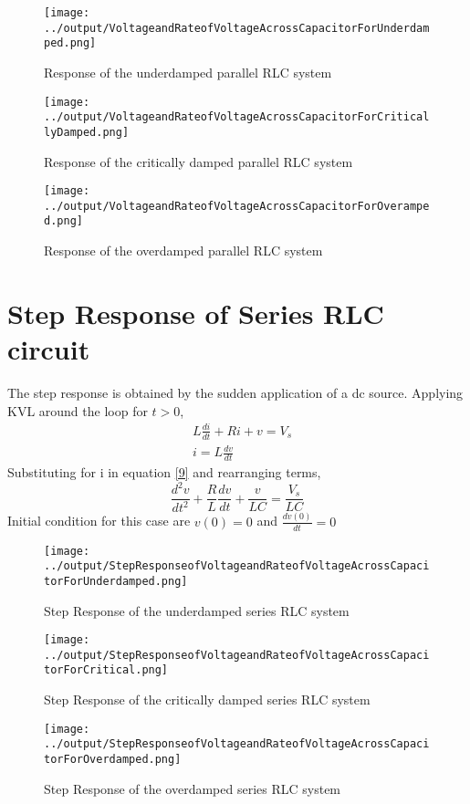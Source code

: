 \documentclass[11pt,a4paper]{article}
\begin{document}
\begin{figure}[H]
\texttt{[image: ../output/VoltageandRateofVoltageAcrossCapacitorForUnderdamped.png]}
\caption{Response of the underdamped parallel RLC system }
\centering
\end{figure}

\begin{figure}[H]
\texttt{[image: ../output/VoltageandRateofVoltageAcrossCapacitorForCriticallyDamped.png]}
\caption{Response of the critically damped parallel RLC system }
\centering
\end{figure}

\begin{figure}[H]
\texttt{[image: ../output/VoltageandRateofVoltageAcrossCapacitorForOveramped.png]}
\caption{Response of the overdamped parallel RLC system }
\centering
\end{figure}

\section{Step Response of Series RLC circuit \cite{Alexander}}
The step response is obtained by the sudden application of a dc source. Applying KVL around the loop for $t>0$,
\begin{align}
 &L\frac{di}{dt} + Ri + v = V_s \label{9} \\
 &i = L\frac{dv}{dt}
\end{align}
 Substituting for i in equation \ref{9}  and rearranging terms,
 $$ \frac{d^2v}{dt^2} + \frac{R}{L}\frac{dv}{dt} + \frac{v}{LC} =  \frac{V_s}{LC} $$
 Initial condition for this case are $v(0) = 0$ and $\frac{dv(0)}{dt} = 0 $

\begin{figure}[H]
\texttt{[image: ../output/StepResponseofVoltageandRateofVoltageAcrossCapacitorForUnderdamped.png]}
\caption{Step Response of the underdamped series RLC system }
\centering
\end{figure}

\begin{figure}[H]
\texttt{[image: ../output/StepResponseofVoltageandRateofVoltageAcrossCapacitorForCritical.png]}
\caption{Step Response of the critically damped series RLC system }
\centering
\end{figure}

\begin{figure}[H]
\texttt{[image: ../output/StepResponseofVoltageandRateofVoltageAcrossCapacitorForOverdamped.png]}
\caption{Step Response of the overdamped series RLC system }
\centering
\end{figure} 
 
{}
 
 
\end{document}
